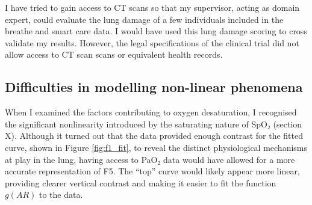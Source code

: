 I have tried to gain access to CT scans so that my supervisor, acting as domain expert, could evaluate the lung damage of a few individuals included in the breathe and smart care data. I would have used this lung damage scoring to cross validate my results. However, the legal specifications of the clinical trial did not allow access to CT scan scans or equivalent health records.

\subsection{Difficulties in modelling non-linear phenomena}
When I examined the factors contributing to oxygen desaturation, I recognised the significant nonlinearity introduced by the saturating nature of SpO₂ (section X). Although it turned out that the data provided enough contrast for the fitted curve, shown in Figure \ref{fig:f1_fit}, to reveal the distinct physiological mechanisms at play in the lung, having access to PaO₂ data would have allowed for a more accurate representation of F5. The “top” curve would likely appear more linear, providing clearer vertical contrast and making it easier to fit the function $g(AR)$ to the data. 








